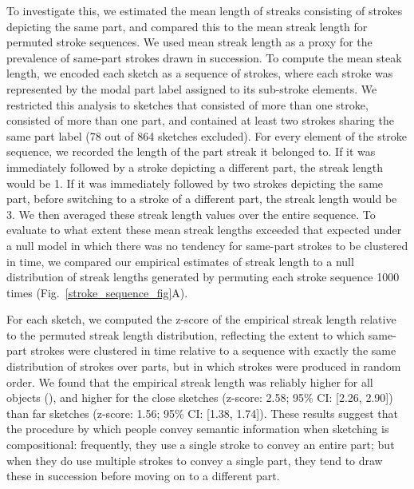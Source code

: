 \documentclass[10pt,letterpaper]{article}
\newcommand{\jefan}[1]{{\color{blue}{[jefan: #1]}}}
\begin{document}
To investigate this, we estimated the mean length of streaks consisting of strokes depicting the same part, and compared this to the mean streak length for permuted stroke sequences. 
We used mean streak length as a proxy for the prevalence of same-part strokes drawn in succession. 
To compute the mean steak length, we encoded each sketch as a sequence of strokes, where each stroke was represented by the modal part label assigned to its sub-stroke elements. 
We restricted this analysis to sketches that consisted of more than one stroke, consisted of more than one part, and contained at least two strokes sharing the same part label (78 out of 864 sketches excluded). 
\jefan{Is mean streak length conditioned on there being multiple consecutive strokes (i.e., >1) that shared a part label? This was in the initial draft: `Whenever multiple consecutive strokes that the sketcher had made shared a part-label, we counted the number of such strokes and termed it as a streak length for that part.' But if so, then mean streak length should never be less than 2. Please clarify.}
For every element of the stroke sequence, we recorded the length of the part streak it belonged to. 
If it was immediately followed by a stroke depicting a different part, the streak length would be 1. 
If it was immediately followed by two strokes depicting the same part, before switching to a stroke of a different part, the streak length would be 3. 
We then averaged these streak length values over the entire sequence. 
To evaluate to what extent these mean streak lengths exceeded that expected under a null model in which there was no tendency for same-part strokes to be clustered in time, we compared our empirical estimates of streak length to a null distribution of streak lengths generated by permuting each stroke sequence 1000 times (Fig.~\ref{stroke_sequence_fig}A). 
\jefan{Let's use `empirical' and `permuted' instead of `true' and `scrambled'.}

For each sketch, we computed the z-score of the empirical streak length relative to the permuted streak length distribution, reflecting the extent to which same-part strokes were clustered in time relative to a sequence with exactly the same distribution of strokes over parts, but in which strokes were produced in random order. 
We found that the empirical streak length was reliably higher for all objects (\jefan{we need a stat for this, like a p-value reflecting the number of times the permuted streak length exceeded the empirical. If this never happened, then we can say ps < 0.001.}), and higher for the close sketches (z-score: 2.58; 95\% CI: [2.26, 2.90]) than far sketches (z-score: 1.56; 95\% CI: [1.38, 1.74]).
These results suggest that the procedure by which people convey semantic information when sketching is compositional: frequently, they use a single stroke to convey an entire part; but when they do use multiple strokes to convey a single part, they tend to draw these in succession before moving on to a different part. 
\end{document}

